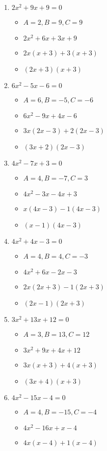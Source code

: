 \documentclass{article}
\begin{document}
\begin{enumerate}
\item $2x^{2} + 9x + 9 = 0$
  \begin{itemize}
  \item $A=2, B=9, C=9$
  \item $2x^{2}+6x+3x+9$
  \item $2x(x+3)+3(x+3)$
  \item $(2x+3)(x+3)$
  \end{itemize}
\item $6x^{2} - 5x - 6 = 0$
  \begin{itemize}
  \item $A=6, B=-5, C=-6$
  \item $6x^{2}-9x+4x-6$
  \item $3x(2x-3)+2(2x-3)$
  \item $(3x+2)(2x-3)$
  \end{itemize}
\item $4x^{2} - 7x + 3 = 0$
  \begin{itemize}
  \item $A=4, B=-7, C=3$
  \item $4x^{2}-3x-4x+3$
  \item $x(4x-3)-1(4x-3)$
  \item $(x-1)(4x-3)$
  \end{itemize}
\item $4x^{2} + 4x - 3 = 0$
  \begin{itemize}
  \item $A=4, B=4, C=-3$
  \item $4x^{2}+6x-2x-3$
  \item $2x(2x+3)-1(2x+3)$
  \item $(2x-1)(2x+3)$
  \end{itemize}
\item $3x^{2} + 13x + 12 = 0$
  \begin{itemize}
  \item $A=3, B=13, C=12$
  \item $3x^{2}+9x+4x+12$
  \item $3x(x+3)+4(x+3)$
  \item $(3x+4)(x+3)$
  \end{itemize}
\item $4x^{2} - 15x - 4 = 0$
  \begin{itemize}
  \item $A=4, B=-15, C=-4$
  \item $4x^{2}-16x+x-4$
  \item $4x(x-4)+1(x-4)$

\end{itemize}
\end{enumerate}
\end{document}

